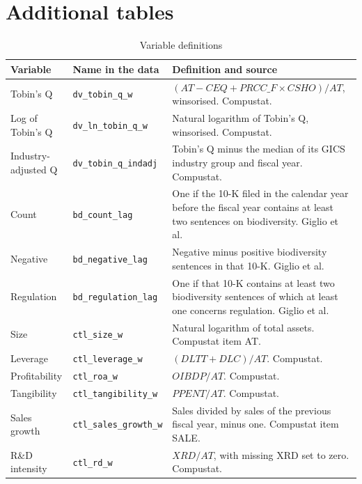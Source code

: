 \documentclass[12pt,a4paper]{article}
\begin{document}
\clearpage
\appendix
\renewcommand{\thetable}{A\arabic{table}}
\setcounter{table}{0}
\section{Additional tables}

\begin{table}[!htbp]
\centering\small
\caption{Variable definitions}\label{tab:variables}
\begin{tabularx}{\linewidth}{@{}>{\raggedright\arraybackslash}p{3.3cm}>{\raggedright\arraybackslash}p{3.6cm}>{\raggedright\arraybackslash}X@{}}
\toprule
Variable & Name in the data & Definition and source \\
\midrule
Tobin's Q & \texttt{dv\_tobin\_q\_w} & $(\mathit{AT} - \mathit{CEQ} + \mathit{PRCC\_F} \times \mathit{CSHO}) / \mathit{AT}$, winsorised. Compustat. \\
Log of Tobin's Q & \texttt{dv\_ln\_tobin\_q\_w} & Natural logarithm of Tobin's Q, winsorised. Compustat. \\
Industry-adjusted Q & \texttt{dv\_tobin\_q\_indadj} & Tobin's Q minus the median of its GICS industry group and fiscal year. Compustat. \\
Count & \texttt{bd\_count\_lag} & One if the 10-K filed in the calendar year before the fiscal year contains at least two sentences on biodiversity. Giglio et al. \\
Negative & \texttt{bd\_negative\_lag} & Negative minus positive biodiversity sentences in that 10-K. Giglio et al. \\
Regulation & \texttt{bd\_regulation\_lag} & One if that 10-K contains at least two biodiversity sentences of which at least one concerns regulation. Giglio et al. \\
Size & \texttt{ctl\_size\_w} & Natural logarithm of total assets. Compustat item AT. \\
Leverage & \texttt{ctl\_leverage\_w} & $(\mathit{DLTT} + \mathit{DLC}) / \mathit{AT}$. Compustat. \\
Profitability & \texttt{ctl\_roa\_w} & $\mathit{OIBDP} / \mathit{AT}$. Compustat. \\
Tangibility & \texttt{ctl\_tangibility\_w} & $\mathit{PPENT} / \mathit{AT}$. Compustat. \\
Sales growth & \texttt{ctl\_sales\_growth\_w} & Sales divided by sales of the previous fiscal year, minus one. Compustat item SALE. \\
R\&D intensity & \texttt{ctl\_rd\_w} & $\mathit{XRD} / \mathit{AT}$, with missing XRD set to zero. Compustat. \\

\end{tabularx}
\end{table}
\end{document}
